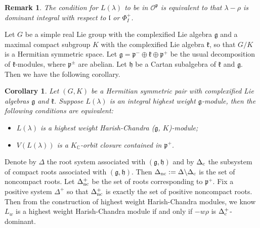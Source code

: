 \documentclass{amsart}[12pt]
\newtheorem{Cor}{Corollary}[section]
\newtheorem{Rem}{Remark}[section]
\def\fpp{\mathfrak{p}}
\def\fll{\mathfrak{l}}
\def\cO{\mathcal{O}}
\numberwithin{equation}{section}
\begin{document}
\begin{Rem}
	The condition for $L(\lambda)$  to be in $\mathscr{O}^\fpp$ is equivalent to that $\lambda-\rho$ is dominant integral with respect to $\fll$ or $\Phi^+_I$.
\end{Rem}
%
%
%




Let $G$ be a simple real Lie group with the complexified Lie algebra $\mathfrak{g}$ and a maximal compact subgroup $K$ with the complexified Lie algebra $\mathfrak{k}$, so that $G/K$ is a Hermitian symmetric space. Let $\mathfrak{g} =\mathfrak{p}^-\oplus\mathfrak{k}\oplus\mathfrak{p}^+$ be the usual decomposition of $\mathfrak{k}$-modules, where $\mathfrak{p}^\pm$ are abelian.  Let $\mathfrak{h}$ be a Cartan subalgebra of $\mathfrak{k}$ and $\mathfrak{g}$. Then we have the following corollary.


\begin{Cor}\label{HC}Let $(G,K)$ be a Hermitian symmetric pair with complexified Lie algebras $\mathfrak{g}$ and $\mathfrak{k}$. Suppose $L(\lambda)$ is an integral highest weight $\mathfrak{g}$-module, then the following conditions are equivalent:
	\begin{itemize}
		\item [(1)]  $L(\lambda)$ is a highest weight Harish-Chandra ($\mathfrak{g}$, $K$)-module;
		\item [(2)] $V(L(\lambda))$ is a $K_{\mathbb{C}}$-orbit closure contained in $\mathfrak{p}^+$.
		
	\end{itemize}

\end{Cor}



Denote by $\Delta$ the root system associated with $(\mathfrak{g}, \mathfrak{h})$ and by $\Delta_{\rm{c}}$ the subsystem of compact roots associated with $(\mathfrak{g}, \mathfrak{h})$. Then $\Delta_{\rm{nc}}:=\Delta\backslash\Delta_{\rm{c}}$ is the set of noncompact roots. Let $\Delta_{\rm{nc}}^+$ be the set of roots corresponding to $\mathfrak{p}^+$. Fix a positive system $\Delta^+$ so that $\Delta_{\rm{nc}}^+$ is exactly the set of positive noncompact roots.  Then from the construction of highest weight Harish-Chandra modules, we know
	$L_w$ is a highest weight Harish-Chandra module if and only if $-w\rho$ is $\Delta_{\rm{c}}^+$-dominant.
\end{document}
